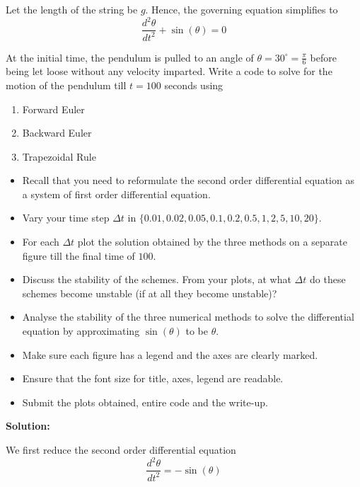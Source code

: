 \documentclass[a4paper,11pt]{report}
\begin{document}
\begin{enumerate}
    Let the length of the string be $g$. Hence, the governing equation simplifies to
    \begin{equation*}
    \frac{d^{2} \theta}{dt^{2}} + \sin(\theta) = 0
    \end{equation*}

    At the initial time, the pendulum is pulled to an angle of $\theta = 30^{\circ} =
    \displaystyle \frac{\pi}{6}$
    before being let loose without any velocity imparted. Write a code to solve for the
    motion of the pendulum till $t = 100$ seconds using

    \begin{enumerate}
    \item Forward Euler
    \item Backward Euler
    \item Trapezoidal Rule
    \end{enumerate}

    \begin{itemize}
    \item Recall that you need to reformulate the second order differential equation as a
    system of first order differential equation.
    \item Vary your time step $\Delta t$ in $\{0.01, 0.02, 0.05, 0.1, 0.2, 0.5, 1, 2, 5,
    10, 20\}$.
    \item For each $\Delta t$ plot the solution obtained by the three methods on a separate
    figure till the final time of $100$.
    \item Discuss the stability of the schemes. From your plots, at what $\Delta t$ do these
    schemes become unstable (if at all they become unstable)?
    \item Analyse the stability of the three numerical methods to solve the differential
    equation by approximating $\sin(\theta)$ to be $\theta$.
    \item Make sure each figure has a legend and the axes are clearly marked.
    \item Ensure that the font size for title, axes, legend are readable.
    \item Submit the plots obtained, entire code and the write-up.
    \end{itemize}

    \textbf{Solution:}

    We first reduce the second order differential equation
    \begin{equation*}
    \frac{d^{2} \theta}{dt^{2}} = - \sin(\theta)
    \end{equation*}


\end{enumerate}
\end{document}
